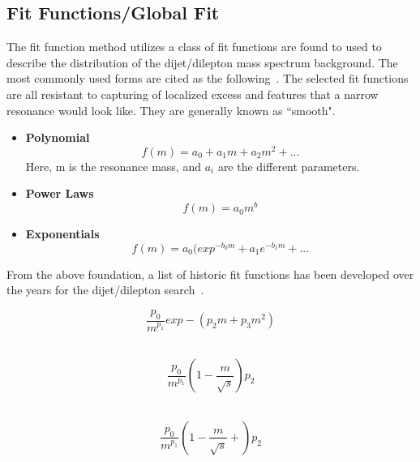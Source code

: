 \subsection{Fit Functions/Global Fit}
\label{sec:fitfunction}
    The fit function method utilizes a class of fit functions are found to used to describe the distribution of the dijet/dilepton mass spectrum background. The most commonly used forms are cited as the following~\cite{ATL-PHYS-PUB-2020-028}. The selected fit functions are all resistant to capturing of localized excess and features that a narrow resonance would look like. They are generally known as ``smooth".

    \begin{itemize}

    \item \textbf{Polynomial}
        \begin{equation}
            f(m)= a_0 + a_{1}m + a_{2}m^{2}+...
        \end{equation} Here, m is the resonance mass, and $a_{i}$ are the different parameters.
    \item \textbf{Power Laws}
        \begin{equation}
            f(m)= a_{0}m^{b}
        \end{equation}

    \item \textbf{Exponentials}
        \begin{equation}
            f(m) = a_{0}(exp^{-b_{0}m} +a_{1}e^{-b_{1}m}+...
        \end{equation}

    \end{itemize}

From the above foundation, a list of historic fit functions has been developed over the years for the dijet/dilepton search~\cite{Pachal:2063032}.

    \begin{equation}
        \frac{p_{0}}{m^{p_{1}}}exp-(p_{2}m+p_{3}m^{2})
    \end{equation}
    ~\cite{UA2:1990gao}

    \begin{equation}
        \frac{p_{0}}{m^{p_{1}}}(1-\frac{m}{\sqrt{s}})p_{2}
    \end{equation}
    ~\cite{1995}

    \begin{equation}
        \frac{p_{0}}{m^{p_{1}}}(1-\frac{m}{\sqrt{s}}+)p_{2}
    \end{equation}
    ~\cite{b582dc2d9c234174bfe2adbc9729bf42}

